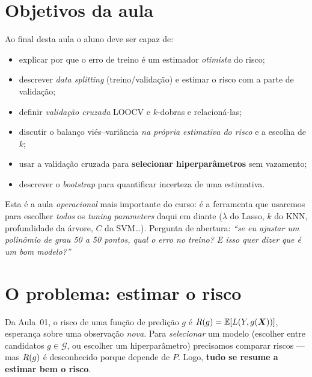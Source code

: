 \documentclass[11pt,a4paper]{article}
\begin{document}

\section*{Objetivos da aula}
Ao final desta aula o aluno deve ser capaz de:
\begin{itemize}[leftmargin=1.4cm]
  \item explicar por que o erro de treino é um estimador \emph{otimista} do risco;
  \item descrever \emph{data splitting} (treino/validação) e estimar o risco com a
        parte de validação;
  \item definir \emph{validação cruzada} LOOCV e $k$-dobras e relacioná-las;
  \item discutir o balanço viés--variância \emph{na própria estimativa do risco} e
        a escolha de $k$;
  \item usar a validação cruzada para \textbf{selecionar hiperparâmetros} sem
        vazamento;
  \item descrever o \emph{bootstrap} para quantificar incerteza de uma estimativa.
\end{itemize}

\begin{emsala}
Esta é a aula \emph{operacional} mais importante do curso: é a ferramenta que
usaremos para escolher \emph{todos} os \emph{tuning parameters} daqui em diante
($\lambda$ do Lasso, $k$ do KNN, profundidade da árvore, $C$ da SVM\dots).
Pergunta de abertura: \emph{``se eu ajustar um polinômio de grau 50 a 50 pontos,
qual o erro no treino? E isso quer dizer que é um bom modelo?''}
\end{emsala}

\section{O problema: estimar o risco}
Da Aula~01, o risco de uma função de predição $g$ é
$R(g)=\mathbb{E}[L(Y,g(\bm{X}))]$, esperança sobre uma observação \emph{nova}. Para
\emph{selecionar} um modelo (escolher entre candidatos $g\in\mathcal{G}$, ou
escolher um hiperparâmetro) precisamos comparar riscos --- mas $R(g)$ é
desconhecido porque depende de $P$. Logo, \textbf{tudo se resume a estimar bem o
risco}.
\end{document}
